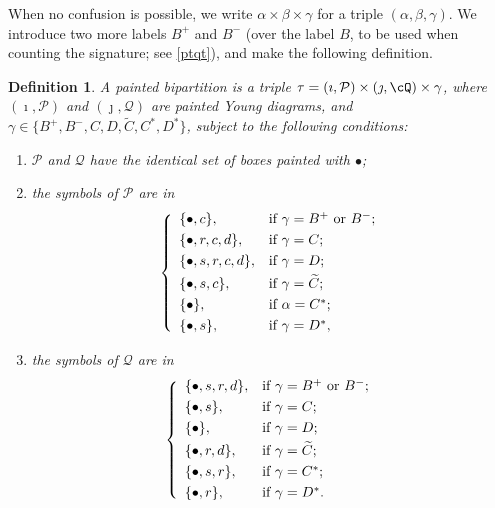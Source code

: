 \documentclass[11pt,a4paper]{amsart}
\newcommand{\CP}{{\mathcal {P}}}
\numberwithin{equation}{section}
\newtheorem{defn}[thm]{Definition}
\theoremstyle{remark}
\begin{document}
When no confusion is possible, we write $\alpha\times \beta\times \gamma$ for a triple $(\alpha, \beta, \gamma)$.   We introduce two more labels $B^+$ and $B^-$ (over the label $B$, to be  used when counting the signature; see \eqref{ptqt}), and make the following definition.
 \begin{defn}\label{defpbp0}
 A painted bipartition is a triple
  $\tau=(\imath, \CP)\times (\jmath, \cQ)\times \gamma$, where $(\imath, \CP)$
  and $ (\jmath, \mathcal Q)$ are painted Young diagrams, and
  $\gamma \in \{B^+,B^-, C,D,\widetilde {C}, C^*, D^*\}$, subject to the
  following conditions:
  \begin{enumerate}
 \item $\CP$ and $\mathcal Q$ have the identical set of boxes painted with $\bullet$;    
    \item the symbols of $\CP$ are in 
          \[
          \left\{
          \begin{array}{ll}
            \{\bullet, c\}, &\hbox{if $\gamma=B^+$ or $B^-$}; \smallskip\\
            \{\bullet,  r, c,d\}, &\hbox{if $\gamma=C$}; \smallskip\\
            \{\bullet, s, r, c,d\}, &\hbox{if $\gamma=D$}; \smallskip\\
            \{\bullet, s, c\}, &\hbox{if $\gamma=\widetilde{ C}$}; \smallskip \\
            \{\bullet\}, &\hbox{if $\alpha=C^*$}; \smallskip \\
            \{\bullet, s\}, &\hbox{if $\gamma=D^*$},\\
          \end{array}
          \right.
          \]
    \item the symbols of $\mathcal Q$ are in           \[
          \left\{
          \begin{array}{ll}
            \{\bullet, s, r, d\}, &\hbox{if $\gamma=B^+$ or $B^-$}; \smallskip\\
            \{\bullet, s\}, &\hbox{if $\gamma=C$}; \smallskip\\
            \{\bullet\}, &\hbox{if $\gamma=D$}; \smallskip\\
            \{\bullet, r, d\}, &\hbox{if $\gamma=\widetilde{ C}$}; \smallskip\\
            \{\bullet, s,r\}, &\hbox{if $\gamma=C^*$}; \smallskip \\
            \{\bullet, r\}, &\hbox{if $\gamma=D^*$}.
          \end{array}
          \right.
          \]

  \end{enumerate}
  \end{defn}
\end{document}
